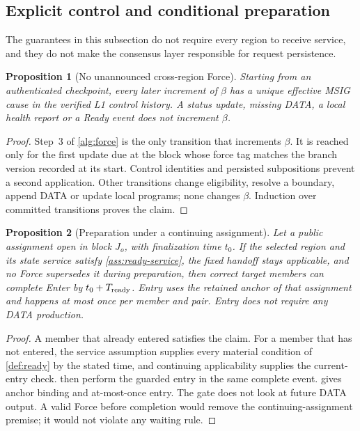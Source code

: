 \documentclass[11pt,a4paper]{article}
\newtheorem{proposition}[proposition]{Proposition}
\begin{document}
\subsection{Explicit control and conditional preparation}
\label{sec:liveness}
The guarantees in this subsection do not require every region to receive
service, and they do not make the consensus layer responsible for
request persistence.

\begin{proposition}[No unannounced cross-region Force]
\label{prop:explicit-force}
Starting from an authenticated checkpoint, every later increment of
$\beta$ has a unique effective MSIG cause in the verified L1 control
history. A status update, missing DATA, a local health report or a Ready
event does not increment $\beta$.
\end{proposition}
\begin{proof}
Step~3 of \cref{alg:force} is the only transition that increments
$\beta$. It is reached only for the first update due at the block whose force
tag matches the branch version recorded at its start. Control identities
and persisted subpositions prevent a second application. Other
transitions change eligibility, resolve a boundary, append DATA or update
local programs; none changes $\beta$. Induction over committed
transitions proves the claim.
\end{proof}

\begin{proposition}[Preparation under a continuing assignment]
\label{prop:ready-bound}
Let a public assignment open in block $J_o$, with finalization time
$t_0$. If the selected region and its state service satisfy
\cref{ass:ready-service}, the fixed handoff stays applicable, and no
Force supersedes it during preparation, then correct target members can
complete Enter by $t_0+T_{\rm ready}$. Entry uses the retained
anchor of that assignment and happens at most once per member and pair.
Entry does not require any DATA production.
\end{proposition}
\begin{proof}
A member that already entered satisfies the claim. For a member that has
not entered, the service assumption supplies every material condition of
\cref{def:ready} by the stated time, and continuing applicability
supplies the current-entry check.  then
perform the guarded entry in the same complete event.
 gives anchor binding and at-most-once
entry. The gate does not look at future DATA output. A valid Force before
completion would remove the continuing-assignment premise; it would not
violate any waiting rule.
\end{proof}
\end{document}
